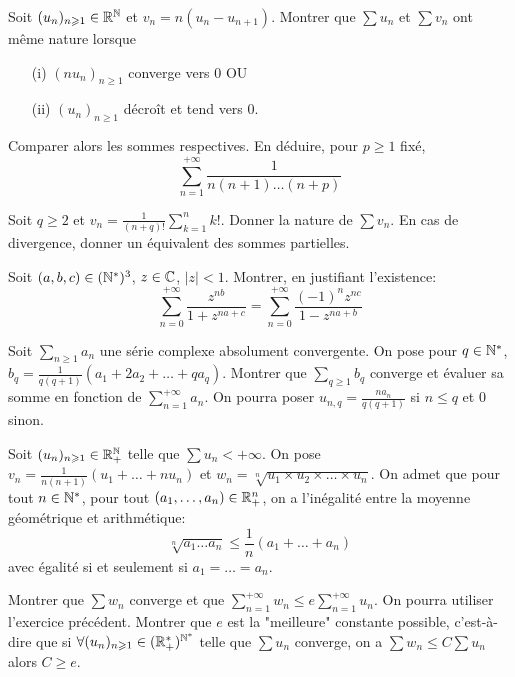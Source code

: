 \documentclass[12pt]{article}
\begin{document}
\begin{exercise}
	Soit $(u_{n})_{n\geqslant1}\in\mathbb{R}^{\mathbb{N}}$ et $v_{n}=n(u_{n}-u_{n+1})$. Montrer
	que $\sum u_{n}$ et $\sum v_{n}$ ont même nature lorsque
	\begin{enumerate}
		\item
		[(i)] $(nu_{n})_{n\geqslant1}$ converge vers 0 OU
		\item
		[(ii)] $(u_{n})_{n\geqslant 1}$ décroît et tend vers 0.
	\end{enumerate}
	Comparer alors les sommes respectives. En déduire, pour $p\geqslant1$ fixé,
	$$\sum_{n=1}^{+\infty}\frac{1}{n(n+1)\dots(n+p)}$$
\end{exercise}

\begin{exercise}
	Soit $q\geqslant2$ et $v_{n}=\frac{1}{(n+q)!}\sum_{k=1}^{n}k!$. Donner la nature de
	$\sum v_{n}$. En cas de divergence, donner un équivalent des sommes
	partielles.
\end{exercise}

\begin{exercise}
	Soit $(a,b,c)\in (\mathbb{N}^{*})^{3}$, $z\in\mathbb{C}$, $\vert z\vert<1$. Montrer, en
	justifiant l'existence:
	$$\sum_{n=0}^{+\infty}\frac{z^{nb}}{1+z^{na+c}}=\sum_{n=0}^{+\infty}\frac{(-1)^{n}z^{nc}}{1-z^{na+b}}$$
\end{exercise}

\begin{exercise}
	Soit $\sum_{n\geqslant1} a_{n}$ une série complexe absolument convergente. On
	pose pour $q\in\mathbb{N}^{*}$, $b_q=\frac{1}{q(q+1)}(a_{1}+2a_{2}+\dots+qa_{q})$.
	Montrer que $\sum_{q\geqslant1}b_{q}$ converge et évaluer sa somme en fonction
	de $\sum_{n=1}^{+\infty}a_{n}$. On pourra poser
	$u_{n,q}=\frac{na_{n}}{q(q+1)}$ si $n\leqslant q$ et 0 sinon.
\end{exercise}

\begin{exercise}
	Soit $(u_{n})_{n\geqslant1}\in\mathbb{R}_{+}^{\mathbb{N}}$ telle que $\sum u_{n}<+\infty$. On
	pose $v_{n}=\frac{1}{n(n+1)}(u_{1}+\dots+nu_{n})$ et $w_{n}=\sqrt[n]{u_1\times
	u_2\times\dots\times u_n}$. On admet que pour tout $n\in\mathbb{N}^{*}$, pour tout
	$(a_{1},\dots,a_{n})\in\mathbb{R}_{+}^{n}$, on a l'inégalité entre la moyenne
	géométrique et arithmétique:
	$$\sqrt[n]{a_{1}\dots a_{n}}\leqslant\frac{1}{n}(a_{1}+\dots+a_{n})$$ avec
	égalité si et seulement si $a_{1}=\dots=a_{n}$.

	Montrer que $\sum w_{n}$ converge et que $\sum_{n=1}^{+\infty}w_{n}\leqslant
	e\sum_{n=1}^{+\infty}u_{n}$. On pourra utiliser l'exercice précédent. Montrer
	que $e$ est la "meilleure" constante possible, c'est-à-dire que si $\forall
	(u_{n})_{n\geqslant1}\in(\mathbb{R}_{+}^{*})^{\mathbb{N}^{*}}$ telle que $\sum u_{n}$
	converge, on a $\sum w_{n}\leqslant C\sum u_{n}$ alors $C\geqslant e$.
\end{exercise}
\end{document}
